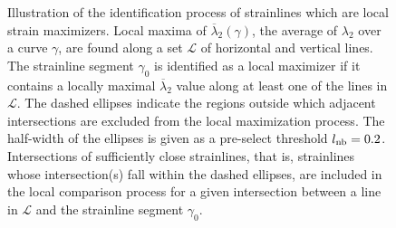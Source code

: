 \begin{figure}[htpb]
    \centering
    \def\svgwidth{0.8\linewidth}
    
    \caption[The identification process of strainlines which
    are local strain maximizers]{Illustration of the identification process of
        strainlines which are local strain maximizers.
        Local maxima of $\overline{\lambda}_{2}(\gamma)$, the average of
        $\lambda_{2}$ over a curve $\gamma$, are found along a set $\mathcal{L}$
        of horizontal and vertical lines. The strainline segment
    $\gamma_{0}$ is identified as a local maximizer if it contains a locally
maximal $\overline{\lambda}_{2}$ value along at least one of the lines in
$\mathcal{L}$. The dashed ellipses indicate the regions outside which
adjacent intersections are excluded from the local maximization process.
The half-width of the ellipses is given as a pre-select threshold
$l_{\textnormal{nb}}=0.2$. Intersections of sufficiently close strainlines,
that is, strainlines whose intersection(s) fall within the dashed
ellipses, are included in the local comparison process for a given intersection
between a line in $\mathcal{L}$ and the strainline segment $\gamma_{0}$.}
    \label{fig:neighborlcs}
\end{figure}
